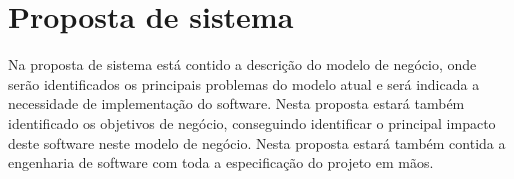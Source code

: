 
\chapter{Proposta de sistema}

Na proposta de sistema está contido a descrição do modelo de negócio, onde serão identificados os principais
 problemas do modelo atual e será indicada a necessidade de implementação do software. Nesta proposta 
 estará também identificado os objetivos de negócio, conseguindo identificar o principal impacto deste 
 software neste modelo de negócio. Nesta proposta estará também contida a engenharia de software com toda 
 a especificação do projeto em mãos.
